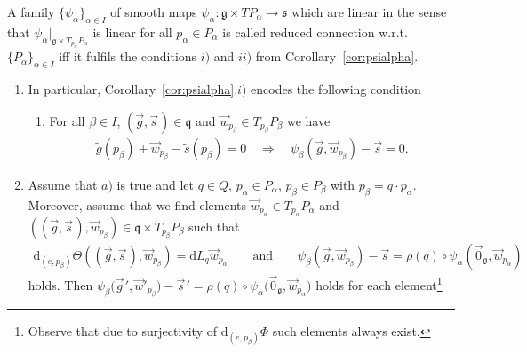 \documentclass[11pt]{article}
\numberwithin{equation}{section}
\newcommand{\wt}[1]{\widetilde{#1}}
\begin{document}
\begin{Definition}
A family $\{\psi_\alpha\}_{\alpha\in I}$ of smooth maps $\psi_\alpha\colon \mathfrak{g}\times TP_\alpha \rightarrow
\mathfrak{s}$ which are linear in the sense that $\psi_\alpha|_{\mathfrak{g}\times T_{p_\alpha}P_\alpha }$ is linear for
all $p_\alpha\in P_\alpha$ is called reduced connection w.r.t.~$\{P_\alpha\}_{\alpha\in I}$ if\/f it fulf\/ils the
conditions $i)$ and $ii)$ from Corollary~\ref{cor:psialpha}.
\end{Definition}
\begin{Remark}\label{rem:Psialphaconderkl}\quad
\begin{enumerate}\itemsep=0pt
\item[1)] In particular, Corollary~\ref{cor:psialpha}.$i)$ encodes the following condition
\begin{enumerate}\itemsep=0pt
\item[$a)$] For all $\beta \in I$, $(\vec{g},\vec{s}\hspace{1pt})\in \mathfrak{q}$ and $\vec{w}_{p_\beta}\in
T_{p_\beta}P_\beta$ we have
\begin{gather*}
\wt{g}(p_\beta) +\vec{w}_{p_\beta}-\wt{s}(p_\beta)=0
\quad
\Longrightarrow
\quad
\psi_\beta(\vec{g},\vec{w}_{p_\beta})-\vec{s}=0.
\end{gather*}
\end{enumerate}
\item[2)] Assume that $a)$ is true and let $q\in Q$, $p_\alpha\in P_\alpha$, $p_\beta \in
P_\beta$ with $p_\beta=q\cdot p_\alpha$.
Moreover, assume that we f\/ind elements $\vec{w}_{p_\alpha}\in T_{p_\alpha}P_\alpha$ and
$((\vec{g},\vec{s}\hspace{1pt}),\vec{w}_{p_\beta})\in \mathfrak{q}\times T_{p_\beta}P_\beta$ such that
\begin{gather*}
\mathrm{d}_{(e,p_\beta)}\Theta((\vec{g},\vec{s}\hspace{1pt}),\vec{w}_{p_\beta})=\mathrm{d} L_q\vec{w}_{p_\alpha}
\qquad
\text{and}
\qquad
\psi_\beta(\vec{g},\vec{w}_{p_\beta})-\vec{s}=\rho(q)\circ\psi_\alpha(\vec{0}_{\mathfrak{g}},\vec{w}_{p_\alpha})
\end{gather*}
holds.
Then
$\psi_\beta\big(\vec{g}\hspace{1pt}{}',\vec{w}'_{p_\beta}\big)-\vec{s}\hspace{1pt}{}'
=\rho(q)\circ\psi_\alpha\big(\vec{0}_{\mathfrak{g}},\vec{w}_{p_\alpha}\big)$
holds for each element\footnote{Observe that due to surjectivity of $\mathrm{d}_{(e,p_\beta)}\Phi$ such elements always exist.}

\end{enumerate}
\end{Remark}
\end{document}
